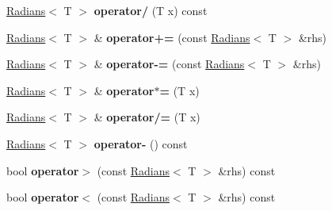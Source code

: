 \begin{DoxyCompactItemize}
\item 
\hypertarget{struct_d_r_d_s_p_1_1_radians_a07897047e80809903de2b24a75ef534c}{\hyperlink{struct_d_r_d_s_p_1_1_radians}{Radians}$<$ T $>$ {\bfseries operator/} (T x) const }\label{struct_d_r_d_s_p_1_1_radians_a07897047e80809903de2b24a75ef534c}

\item 
\hypertarget{struct_d_r_d_s_p_1_1_radians_aafb763fa3a5204f28198b920506e13c2}{\hyperlink{struct_d_r_d_s_p_1_1_radians}{Radians}$<$ T $>$ \& {\bfseries operator+=} (const \hyperlink{struct_d_r_d_s_p_1_1_radians}{Radians}$<$ T $>$ \&rhs)}\label{struct_d_r_d_s_p_1_1_radians_aafb763fa3a5204f28198b920506e13c2}

\item 
\hypertarget{struct_d_r_d_s_p_1_1_radians_a81751685fa9f9ee094e1ee68296693c3}{\hyperlink{struct_d_r_d_s_p_1_1_radians}{Radians}$<$ T $>$ \& {\bfseries operator-\/=} (const \hyperlink{struct_d_r_d_s_p_1_1_radians}{Radians}$<$ T $>$ \&rhs)}\label{struct_d_r_d_s_p_1_1_radians_a81751685fa9f9ee094e1ee68296693c3}

\item 
\hypertarget{struct_d_r_d_s_p_1_1_radians_aaf111110248993e900a35cad2c26d9c4}{\hyperlink{struct_d_r_d_s_p_1_1_radians}{Radians}$<$ T $>$ \& {\bfseries operator$\ast$=} (T x)}\label{struct_d_r_d_s_p_1_1_radians_aaf111110248993e900a35cad2c26d9c4}

\item 
\hypertarget{struct_d_r_d_s_p_1_1_radians_ad740acd1a6c5be95b62aeb2fcf51d06e}{\hyperlink{struct_d_r_d_s_p_1_1_radians}{Radians}$<$ T $>$ \& {\bfseries operator/=} (T x)}\label{struct_d_r_d_s_p_1_1_radians_ad740acd1a6c5be95b62aeb2fcf51d06e}

\item 
\hypertarget{struct_d_r_d_s_p_1_1_radians_a3beb59d32f418293be14c0b62bc6dff5}{\hyperlink{struct_d_r_d_s_p_1_1_radians}{Radians}$<$ T $>$ {\bfseries operator-\/} () const }\label{struct_d_r_d_s_p_1_1_radians_a3beb59d32f418293be14c0b62bc6dff5}

\item 
\hypertarget{struct_d_r_d_s_p_1_1_radians_a99d53743213f21ea8397cd656195f0df}{bool {\bfseries operator$>$} (const \hyperlink{struct_d_r_d_s_p_1_1_radians}{Radians}$<$ T $>$ \&rhs) const }\label{struct_d_r_d_s_p_1_1_radians_a99d53743213f21ea8397cd656195f0df}

\item 
\hypertarget{struct_d_r_d_s_p_1_1_radians_aa21d804fafb91bbf4496ef08812c9a30}{bool {\bfseries operator$<$} (const \hyperlink{struct_d_r_d_s_p_1_1_radians}{Radians}$<$ T $>$ \&rhs) const }\label{struct_d_r_d_s_p_1_1_radians_aa21d804fafb91bbf4496ef08812c9a30}


\end{DoxyCompactItemize}
